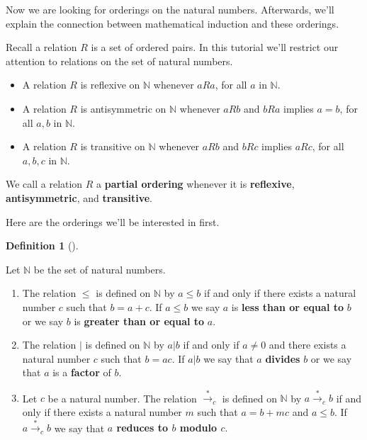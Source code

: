 \documentclass[
  twoside,
  12pt,
  letterpaper]{article}
\providecommand{\tightlist}{%
  \setlength{\itemsep}{0pt}\setlength{\parskip}{0pt}}\usepackage{longtable,booktabs,array}
\theoremstyle{definition}
\theoremstyle{definition}
\newtheorem{definition}{Definition}[section]
\theoremstyle{definition}
\theoremstyle{plain}
\theoremstyle{plain}
\theoremstyle{remark}
\begin{document}
Now we are looking for orderings on the natural numbers. Afterwards,
we'll explain the connection between mathematical induction and these
orderings.

Recall a relation \(R\) is a set of ordered pairs. In this tutorial
we'll restrict our attention to relations on the set of natural numbers.

\begin{itemize}
\tightlist
\item
  A relation \(R\) is reflexive on \(\mathbb{N}\) whenever \(aRa\), for
  all \(a\) in \(\mathbb{N}\).
\item
  A relation \(R\) is antisymmetric on \(\mathbb{N}\) whenever \(aRb\)
  and \(bRa\) implies \(a=b\), for all \(a,b\) in \(\mathbb{N}\).
\item
  A relation \(R\) is transitive on \(\mathbb{N}\) whenever \(aRb\) and
  \(bRc\) implies \(aRc\), for all \(a,b,c\) in \(\mathbb{N}\).
\end{itemize}

We call a relation \(R\) a \textbf{partial ordering} whenever it is
\textbf{reflexive}, \textbf{antisymmetric}, and \textbf{transitive}.

Here are the orderings we'll be interested in first.

\begin{definition}[]\protect\hypertarget{def-less-than-divides}{}\label{def-less-than-divides}

Let \(\mathbb{N}\) be the set of natural numbers.

\begin{enumerate}
\def\labelenumi{\arabic{enumi}.}
\tightlist
\item
  The relation \(\leq\) is defined on \(\mathbb{N}\) by \(a\leq b\) if
  and only if there exists a natural number \(c\) such that \(b=a+c.\)
  If \(a\leq b\) we say \(a\) is \textbf{less than or equal to} \(b\) or
  we say \(b\) is \textbf{greater than or equal to} \(a.\)
\item
  The relation \(\vert\) is defined on \(\mathbb{N}\) by \(a|b\) if and
  only if \(a\neq 0\) and there exists a natural number \(c\) such that
  \(b=ac.\) If \(a\vert b\) we say that \(a\) \textbf{divides} \(b\) or
  we say that \(a\) is a \textbf{factor} of \(b.\)
\item
  Let \(c\) be a natural number. The relation
  \(\overset{*}{\longrightarrow}_c\) is defined on \(\mathbb{N}\) by
  \(a\overset{*}{\longrightarrow}_c b\) if and only if there exists a
  natural number \(m\) such that \(a=b+mc\) and \(a\leq b.\) If
  \(a\overset{*}{\longrightarrow}_c b\) we say that \textbf{\(a\)
  reduces to \(b\) modulo \(c.\)}
\end{enumerate}

\end{definition}
\end{document}
